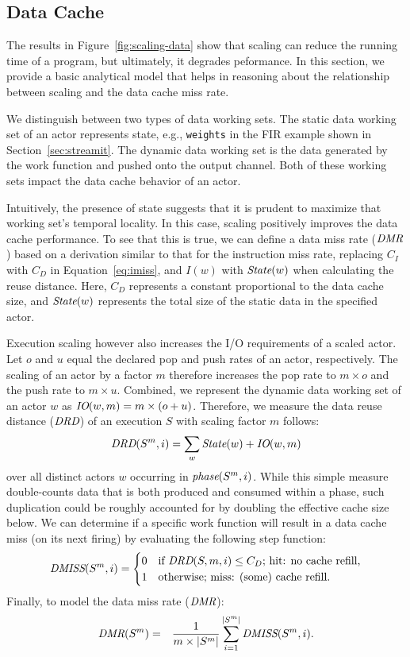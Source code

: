 \subsection{Data Cache}

The results in Figure~\ref{fig:scaling-data} show that scaling can
reduce the running time of a program, but ultimately, it degrades
peformance. In this section, we provide a basic analytical model that
helps in reasoning about the relationship between scaling and the data
cache miss rate. 

We distinguish between two types of data working sets. The static data
working set of an actor represents state, e.g., \texttt{weights} in
the FIR example shown in Section~\ref{sec:streamit}.  The dynamic data
working set is the data generated by the work function and pushed onto
the output channel. Both of these working sets impact the data cache
behavior of an actor.

Intuitively, the presence of state suggests that it is
prudent to maximize that working set's temporal locality. In this
case, scaling positively improves the data cache performance. To see
that this is true, we can define a data miss rate ($\mbox{\it DMR}$) based on
a derivation similar to that for the instruction miss rate, replacing
$C_I$ with $C_D$ in Equation~\ref{eq:imiss}, and $I(w)$ with
$\mbox{\it State}(w)$ when calculating the reuse distance. Here, $C_D$
represents a constant proportional to the data cache size, and
$\mbox{\it State}(w)$ represents the total size of the static data in the
specified actor. 

Execution scaling however also increases the I/O requirements of a
scaled actor. Let $o$ and $u$ equal the declared pop and push rates
of an actor, respectively.  The scaling of an
actor by a factor $m$ therefore increases the pop rate to $m\times o$
and the push rate to $m\times u$. Combined, we represent the dynamic
data working set of an actor $w$ as $\mbox{\it IO}(w, m) =
m\times(o+u)$. Therefore, we measure the data reuse distance ($\mbox{\it DRD}$)
of an execution $S$ with scaling factor $m$ follows:
\[
  \mbox{\it DRD}(S^m,i)=\sum_{w} \mbox{\it State}(w) + \mbox{\it IO}(w,m)
\]
over all distinct actors $w$ occurring in $\mbox{\it phase}(S^m,i)$.  While
this simple measure double-counts data that is both produced and
consumed within a phase, such duplication could be roughly accounted
for by doubling the effective cache size below.  We can determine if a
specific work function will result in a data cache miss (on its next
firing) by evaluating the following step function:
\begin{equation}
\label{eq:dmiss}
  \mbox{\it DMISS}(S^m,i) =
    \begin{cases}
      0& \text{if $\mbox{\it DRD}(S,m,i) \leq C_D$; hit: no cache refill,}\\
      1& \text{otherwise; miss: (some) cache refill.}
    \end{cases}
\end{equation}
Finally, to model the data miss rate ($\mbox{\it DMR}$):
\begin{eqnarray}
  \label{eq:dmrM}
  \mbox{\it DMR}(S^m) &=& \frac{1}{m \times |S^m|}\sum_{i=1}^{|S^m|} \mbox{\it DMISS}(S^m,i).
\end{eqnarray}

